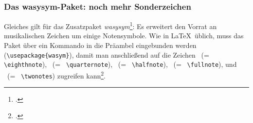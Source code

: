 %
%
%



\subsubsection{Das wasysym-Paket: noch mehr Sonderzeichen}
Gleiches gilt für das Zusatzpaket \textit{wasysym}\footcite[vgl.][\nopage
wp]{CtanWasysym2018a}: Es erweitert den Vorrat an musikalischen Zeichen um
einige Notensymbole. Wie in \LaTeX\ üblich, muss das Paket über ein Kommando in
die Präambel eingebunden werden (\texttt{\textbackslash{usepackage\{wasym\}}}),
damit man anschließend auf die Zeichen \eighthnote \ (= \texttt{\small
\textbackslash{eighthnote}}), \quarternote \ (= \texttt{\small
\textbackslash{quarternote}}), \halfnote \ (= \texttt{\small
\textbackslash{halfnote}}), \fullnote \ (= \texttt{\small
\textbackslash{fullnote}}), und \twonotes \ (= \texttt{\small
\textbackslash{twonotes}}) zugreifen kann\footcite[vgl.][2]{Kielhorn2003a}.

%
